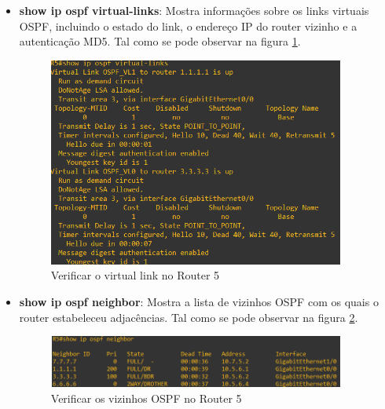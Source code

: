 \documentclass[11pt,english, openright, oneside]{book}
\begin{document}
\begin{itemize}
  \item \textbf{show ip ospf virtual-links}: Mostra informações sobre os links virtuais OSPF, incluindo o estado do link, o endereço IP do router vizinho e a autenticação MD5. Tal como se pode observar na figura \ref{fig:config23}.
  \vspace{0.2cm}

  \begin{figure}[H]
    \centering
    \includegraphics[width=0.92\textwidth]{imagens/Tarefa3/15.virtual_link_test_R5.png}
    \caption{Verificar o virtual link no Router 5}
    \label{fig:config23}
  \end{figure}
  \vspace{0.2cm}

  \item \textbf{show ip ospf neighbor}: Mostra a lista de vizinhos OSPF com os quais o router estabeleceu adjacências. Tal como se pode observar na figura \ref{fig:config24}.
  \vspace{0.2cm}

  \begin{figure}[H]
    \centering
    \includegraphics[width=0.92\textwidth]{imagens/Tarefa3/15.ospf_neigh_R5.png}
    \caption{Verificar os vizinhos OSPF no Router 5}
    \label{fig:config24}
  \end{figure}
  \vspace{0.2cm}


\end{itemize}
\end{document}
